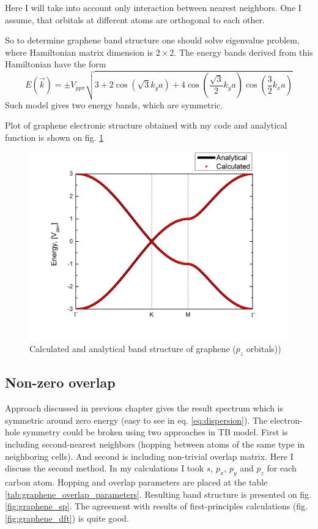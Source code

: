 Here I will take into account only interaction between nearest neighbors. One I assume, that orbitals at different atoms are orthogonal to each other.

So to determine graphene band structure one should solve eigenvalue problem, where Hamiltonian matrix dimension is $2 \times 2$. The energy bands derived from this Hamiltonian have the form \cite{wallace}
\begin{equation} \label{eq:dispersion}
	E(\vec{k}) = \pm V_{pp\pi}\sqrt{3 + 2 \cos\left(\sqrt{3} k_y a\right) + 4 \cos\left(\frac{\sqrt{3}}{2} k_y a\right) \cos\left(\frac{3}{2} k_x a\right)} 
\end{equation}
Such model gives two energy bands, which are symmetric.

Plot of graphene electronic structure obtained with my code and analytical function is shown on fig. \ref{fig:graphene_pz}
\begin{figure}[h]
\begin{center}
  \includegraphics[width=0.65\linewidth]{img/graphene_pz}
  \caption{Calculated and analytical band structure of graphene ($p_z$ orbitals)) \label{fig:graphene_pz}}
\end{center}
\end{figure}

\subsection{Non-zero overlap}
\label{subsec:graphene_result}
Approach discussed in previous chapter gives the result spectrum which is symmetric around zero energy (easy to see in eq. \ref{eq:dispersion}). The electron-hole symmetry could be broken using two approaches in TB model. First is including second-nearest neighbors (hopping between atoms of the same type in neighboring cells). And second is including non-trivial overlap matrix. Here I discuss the second method.
In my calculations I took $s$, $p_x$, $p_y$ and $p_z$ for each carbon atom. Hopping and overlap parameters \cite{basics} are placed at the table \ref{tab:graphene_overlap_parameters}. Resulting band structure is presented on fig. \ref{fig:graphene_sp}. The agreement with results of first-principles calculations \cite{boukhvalov} (fig. \ref{fig:graphene_dft}) is quite good.

